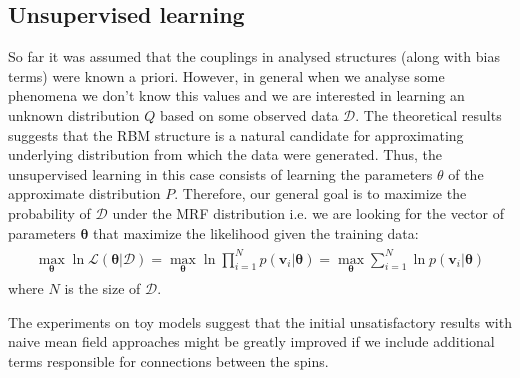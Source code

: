 \documentclass[../report/report.tex]{subfiles}
\begin{document}
\subsection{Unsupervised learning}
So far it was assumed that the couplings in analysed structures (along with bias terms) were known a priori. However, in general when we analyse some phenomena we don't know this values and we are interested in learning an unknown distribution $Q$ based on some observed data $\mathcal{D}$. The theoretical results suggests that the RBM structure is a natural candidate for approximating underlying distribution from which the data were generated. Thus, the unsupervised learning in this case consists of learning the parameters $\theta$ of the approximate distribution $P$. Therefore, our general goal is to maximize the probability of $\mathcal{D}$ under the MRF distribution i.e. we are looking for the vector of parameters $\mathbf{\theta}$ that maximize the likelihood given the training data:
\begin{align}
\begin{split}
\max_{\mathbf{\theta}} \ln \mathcal{L}(\mathbf{\theta}| \mathcal{D}) = \max_{\mathbf{\theta}}  \ln \prod_{i=1}^N p(\mathbf{v}_i |\mathbf{\theta}) = \max_{\mathbf{\theta}} \sum_{i=1}^N \ln p(\mathbf{v}_i |\mathbf{\theta} )
\end{split}
\end{align}
where $N$ is the size of $\mathcal{D}$. 

The experiments on toy models suggest that the initial unsatisfactory results with naive mean field approaches \cite{tieleman2008training} might be greatly improved if we include additional terms responsible for connections between the spins.
\end{document}
